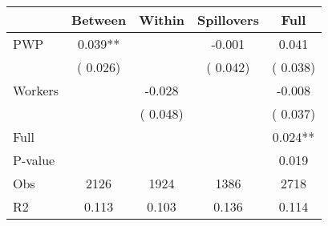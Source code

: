 
\begin{tabular}{l*{4}{c}}\hline&\multicolumn{1}{c}{Between}&\multicolumn{1}{c}{Within}&\multicolumn{1}{c}{Spillovers}&\multicolumn{1}{c}{Full}\\ \hline
 PWP           &              0.039**      &                                               &       -0.001 &         0.041                            \\ 
                               &        (       0.026)           &                                       &       (       0.042)     &      (       0.038)                                           \\ 
 Workers       &                                               &       -0.028    &                                &            -0.008                            \\ 
                               &                                               & (       0.048)                  &                                        &      (       0.037)                                           \\ 
\hline                                                                                                                                                                                                                                            
 Full                  &                                               &                                               &                                        &             0.024**                                     \\ 
 P-value               &                                               &                                               &                                        &             0.019                                           \\ 
 Obs                   &               2126               &       1924                       &       1386                &              2718                                               \\ 
 R2                    &                      0.113              &              0.103                      &              0.136               &                     0.114                                              \\ 
\hline \end{tabular}                                                                                                                                                                                                              